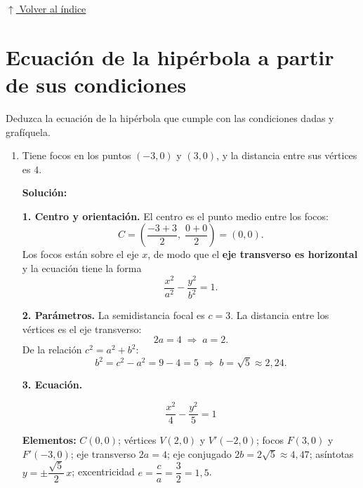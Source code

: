 \documentclass[12pt]{article}
\newcommand{\solucion}{%
    \vspace{0.8em}%
    \textbf{Solución:}%
    \vspace{0.8em}%
}
\newcommand{\volverindice}{%
    \vspace{1em}%
    \begin{flushright}%
        \hyperlink{indice}{\small $\uparrow$ Volver al índice}%
    \end{flushright}%
}
\begin{document}
\volverindice
\newpage


\section{Ecuación de la hipérbola a partir de sus condiciones}

Deduzca la ecuación de la hipérbola que cumple con las condiciones dadas y
grafíquela.

\begin{enumerate}[label=\alph*.-]

    \item Tiene focos en los puntos $(-3,0)$ y $(3,0)$, y la distancia entre sus
    vértices es $4$.

    \solucion

    \textbf{1. Centro y orientación.} El centro es el punto medio entre los
    focos:
    \[
    C=\left(\frac{-3+3}{2},\;\frac{0+0}{2}\right)=(0,0).
    \]
    Los focos están sobre el eje $x$, de modo que el \textbf{eje transverso es
    horizontal} y la ecuación tiene la forma
    \[
    \frac{x^{2}}{a^{2}}-\frac{y^{2}}{b^{2}}=1 .
    \]

    \textbf{2. Parámetros.} La semidistancia focal es $c=3$. La distancia entre
    los vértices es el eje transverso:
    \[
    2a=4\;\Longrightarrow\;a=2 .
    \]
    De la relación $c^{2}=a^{2}+b^{2}$:
    \[
    b^{2}=c^{2}-a^{2}=9-4=5
    \;\Longrightarrow\;
    b=\sqrt5\approx 2{,}24 .
    \]

    \textbf{3. Ecuación.}

    \[
    \boxed{
    \frac{x^{2}}{4}-\frac{y^{2}}{5}=1
    }
    \]

    \textbf{Elementos:} $C(0,0)$; vértices $V(2,0)$ y $V'(-2,0)$; focos
    $F(3,0)$ y $F'(-3,0)$; eje transverso $2a=4$; eje conjugado
    $2b=2\sqrt5\approx 4{,}47$; asíntotas
    $y=\pm\dfrac{\sqrt5}{2}\,x$; excentricidad
    $e=\dfrac{c}{a}=\dfrac32=1{,}5$.


\end{enumerate}
\end{document}
